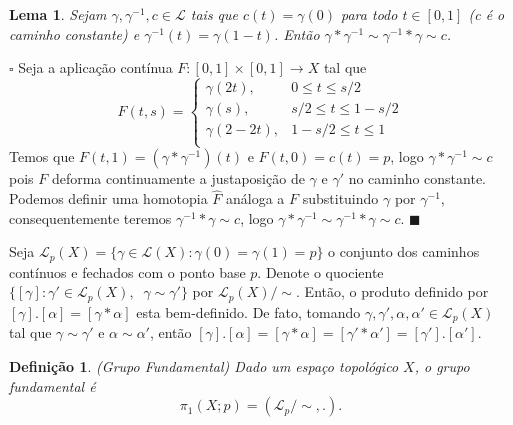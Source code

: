 \documentclass[12pt]{book}
\newtheorem{lema}[teorema]{Lema}
\newtheorem{definicao}[teorema]{Definição}
\newenvironment{prova}[1]{$\square$ #1}{\hfill$\blacksquare$}
\newcommand{\caminhos}{\mathcal{L}}
\newcommand{\caminhospontobase}[1]{\caminhos_{#1}}
\newcommand{\caminhossempontobase}[1]{\caminhos(#1)}
\newcommand{\caminhospontobasegeral}[2]{\caminhos_{#1}(#2)}
\newcommand{\classe}[1]{[#1]}
\newcommand{\grupofundamentalpontobase}[2]{\pi_{1}(#1; #2)}
\newcommand{\intervalo}{[0,1]}
\begin{document}
	\begin{lema}\label{lema_caminho_inverso}
		Sejam $\gamma, \gamma^{-1}, c \in \caminhos$ tais que $c(t) = \gamma(0)$ para todo $t\in \intervalo$ (c é o caminho constante) e $\gamma^{-1}(t) = \gamma(1-t)$. Então $\gamma*\gamma^{-1} \sim \gamma^{-1}*\gamma \sim c$.
	\end{lema} 	
	\begin{prova}
		Seja a aplicação contínua $F:[0,1]\times [0,1]\to X$ tal que
		$$
		F(t,s) = 
		\left\{
		\begin{array}{cc}
		\gamma(2t), & 0\leq t \leq s/2\\
		\gamma(s), & s/2 \leq t \leq 1-s/2\\
		\gamma(2-2t), & 1-s/2 \leq t \leq 1\\
		\end{array}
		\right.
		$$
		Temos que $F(t,1) = (\gamma*\gamma^{-1})(t)$ e $F(t,0) = c(t) = p$, logo $\gamma*\gamma^{-1}\sim c$ pois $F$ deforma continuamente a justaposição de $\gamma$ e $\gamma'$ no caminho constante. Podemos definir uma homotopia $\hat{F}$ análoga a $F$ substituindo $\gamma$ por $\gamma^{-1}$, consequentemente teremos $\gamma^{-1}*\gamma \sim c$, logo $\gamma*\gamma^{-1} \sim \gamma^{-1}*\gamma \sim c$.
	\end{prova}
	
	Seja $\caminhospontobasegeral{p}{X} = \{\gamma\in \caminhossempontobase{X}: \gamma(0)=\gamma(1)=p \}$ o conjunto dos caminhos contínuos e fechados com o ponto base $p$. Denote o quociente $\{ \classe{\gamma} : \gamma' \in \caminhospontobasegeral{p}{X},\;\;\gamma \sim \gamma'\}$ por $\caminhospontobasegeral{p}{X}/\sim $. Então, o produto definido por $\classe{\gamma}.\classe{\alpha} = \classe{\gamma*\alpha}$ esta bem-definido. De fato, tomando $\gamma, \gamma',\alpha, \alpha' \in \caminhospontobasegeral{p}{X}$ tal que $\gamma \sim \gamma'$ e $\alpha \sim \alpha'$, então $\classe{\gamma}.\classe{\alpha} = \classe{\gamma*\alpha} = \classe{\gamma'*\alpha'} = \classe{\gamma'}.\classe{\alpha'}$.
	
	\begin{definicao}
		(Grupo Fundamental) Dado um espaço topológico $X$, o grupo fundamental é
		$$
		\grupofundamentalpontobase{X}{p} = (\caminhospontobase{p}/\sim, .).
		$$
	\end{definicao}
	
\end{document}
